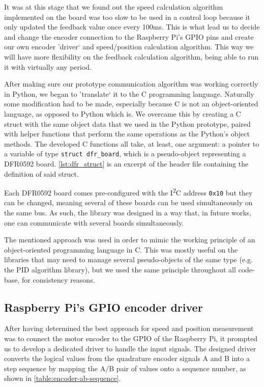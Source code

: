 It was at this stage that we found out the speed calculation algorithm implemented on the board was too slow to be used in a control loop because it only updated the feedback value once every 100ms.
This is what lead us to decide and change the encoder connection to the Raspberry Pi's GPIO pins and create our own encoder 'driver` and speed/position calculation algorithm.
This way we will have more flexibility on the feedback calculation algorithm, being able to run it with virtually any period.

After making sure our prototype communication algorithm was working correctly in Python, we began to 'translate` it to the C programming language.
Naturally some modification had to be made, especially because C is not an object-oriented language, as opposed to Python which is.
We overcame this by creating a C struct with the same object data that we used in the Python prototype, paired with helper functions that perform the same operations as the Python's object methods.
The developed C functions all take, at least, one argument: a pointer to a variable of type \verb|struct dfr_board|, which is a pseudo-object representing a DFR0592 board.
\autoref{lst:dfr_struct} is an excerpt of the header file containing the definition of said struct.



Each DFR0592 board comes pre-configured with the I\textsuperscript{2}C address \verb|0x10| but they can be changed, meaning several of these boards can be used simultaneously on the same bus.
As such, the library was designed in a way that, in future works, one can communicate with several boards simultaneously.

The mentioned approach was used in order to mimic the working principle of an object-oriented programming language in C.
This was mostly useful on the libraries that may need to manage several pseudo-objects of the same type (e.g. the PID algorithm library), but we used the same principle throughout all code-base, for consistency reasons.

\subsection{Raspberry Pi's GPIO encoder driver}
After having determined the best approach for speed and position measurement was to connect the motor encoder to the GPIO of the Raspberry Pi, it prompted us to develop a dedicated driver to handle the input signals.
The designed driver converts the logical values from the quadrature encoder signals A and B into a step sequence by mapping the A/B pair of values onto a sequence number, as shown in \autoref{table:encoder-ab-sequence}.

